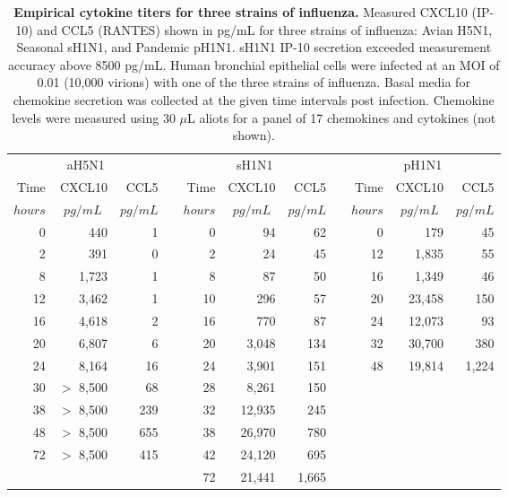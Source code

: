 \documentclass[preprint,10pt,authoryear]{article}
\begin{document}
\begin{table}[!ht]
\begin{center}
\begin{tabular}{| r r r | c | r r r | c | r r r |}
  \multicolumn{3}{c}{aH5N1} & \multicolumn{1}{c}{} & \multicolumn{3}{c}{sH1N1} & \multicolumn{1}{c}{} & \multicolumn{3}{c}{pH1N1}\\
  \cline{1-3} \cline{5-7} \cline{9-11}
  Time & CXCL10 & CCL5 & & Time & CXCL10 & CCL5 & & Time & CXCL10 & CCL5 \\
   \multicolumn{1}{|c}{\footnotesize{$hours$}} & \multicolumn{1}{c}{\footnotesize{$pg/mL$}} & \multicolumn{1}{c|}{\footnotesize{$pg/mL$}} & & \multicolumn{1}{c}{\footnotesize{$hours$}} & \multicolumn{1}{c}{\footnotesize{$pg/mL$}} & \multicolumn{1}{c|}{\footnotesize{$pg/mL$}} & & \multicolumn{1}{c}{\footnotesize{$hours$}} & \multicolumn{1}{c}{\footnotesize{$pg/mL$}} & \multicolumn{1}{c|}{\footnotesize{$pg/mL$}}\\
  \cline{1-3} \cline{5-7} \cline{9-11}
  0 & 440 & 1 & & 0 & 94 & 62 & & 0 & 179 & 45  \\
  2 & 391 & 0 & & 2 & 24 & 45 & & 12 & 1,835 & 55 \\
  8 & 1,723 & 1 & & 8 & 87 & 50 & & 16 & 1,349 & 46 \\
  12 & 3,462 & 1 & & 10 & 296 & 57 & & 20 & 23,458 & 150 \\
  16 & 4,618 & 2 & & 16 & 770 & 87 & & 24 & 12,073 & 93 \\
  20 & 6,807 & 6 & & 20 & 3,048 & 134 & & 32 & 30,700 & 380 \\
  24 & 8,164 & 16 & & 24 & 3,901 & 151 & & 48 & 19,814 & 1,224  \\
  30 & $>$ 8,500 & 68 & & 28 & 8,261 & 150 &  &  &  &  \\
  38 & $>$ 8,500 & 239 & & 32 & 12,935 & 245 &  &  &  &  \\
  48 & $>$ 8,500 & 655 & & 38 & 26,970 & 780 &  &  &  &  \\
  72 & $>$ 8,500 & 415 & & 42 & 24,120 & 695 &  &  &  &  \\
  & & & & 72 & 21,441 & 1,665 &  &  &  &  \\
    \cline{1-3} \cline{5-7} \cline{9-11}
\end{tabular}
\caption{\textbf{Empirical cytokine titers for three strains of influenza.}  Measured CXCL10 (IP-10) and CCL5 (RANTES) shown in pg/mL for three strains of influenza: Avian H5N1, Seasonal sH1N1, and Pandemic pH1N1.  sH1N1 IP-10 secretion exceeded measurement accuracy above 8500 pg/mL.  Human bronchial epithelial cells were infected at an MOI of 0.01 (10,000 virions) with one of the three strains of influenza.  Basal media for chemokine secretion was collected at the given time intervals post infection.  Chemokine levels were measured using 30 $\mu$L aliots for a panel of 17 chemokines and cytokines (not shown).}
\label{tab:data}
\end{center}
\end{table}
\end{document}
